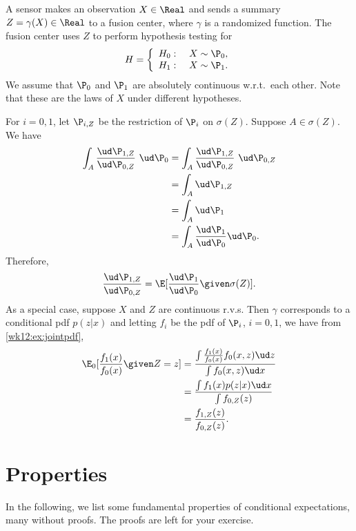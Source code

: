 \documentclass[../aipt.tex]{subfiles}
\begin{document}
\begin{Example}
A sensor makes an observation $X \in \Real$ and sends a summary $Z = \gamma(X) \in \Real$ to a fusion center, where $\gamma$ is a randomized function. The fusion center uses $Z$ to perform hypothesis testing for
\begin{align*}
H=\left\{
\begin{array}{ll}
H_0:\ &X\sim \P_0, \\
H_1:\ &X\sim \P_1.
\end{array}
\right.
\end{align*} 
We assume that $\P_0$ and $\P_1$ are absolutely continuous w.r.t.\ each other. Note that these are the laws of $X$ under different hypotheses.

For $i=0,1$, let $\P_{i,Z}$ be the restriction of $\P_i$ on $\sigma(Z)$. Suppose $A\in \sigma(Z)$. We have 
\begin{align*}
\int_A \frac{\ud \P_{1,Z}}{\ud \P_{0,Z}}\ \ud \P_0&=\int_A \frac{\ud \P_{1,Z}}{\ud \P_{0,Z}}\ \ud \P_{0,Z} \\
&= \int _A \ud \P_{1,Z}\\
&= \int_A \ud \P_1 \\
&= \int_A \frac{\ud \P_1}{\ud \P_0 }\ud \P_0.
\end{align*}
Therefore,
\begin{align*}
\frac{\ud \P_{1,Z}}{\ud \P_{0,Z}}=\E[\frac{\ud \P_1 }{\ud \P_0 } \given \sigma(Z)].
\end{align*}
As a special case, suppose $X$ and $Z$ are continuous r.v.s. Then $\gamma$ corresponds to a conditional pdf $p(z|x)$ and letting $f_i$ be the pdf of $\P_i$, $i=0,1$, we have from \cref{wk12:ex:jointpdf},
\begin{align*}
\E_{0}[\frac{f_1(x)}{f_0(x)} \given Z=z] 
&=\frac{\int \frac{f_1(x)}{f_0(x)} f_0(x,z)\ud z}{\int f_0(x,z)\ud x}\\
&=\frac{\int {f_1(x)} p(z|x)\ud x}{\int f_{0,Z}(z)}\\
&=\frac{ f_{1,Z}(z)}{ f_{0,Z}(z)}.
\end{align*}
\end{Example}


\section{Properties}
In the following, we list some fundamental properties of conditional expectations, many without proofs. The proofs are left for your exercise.
\end{document}
